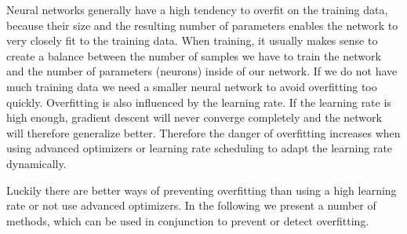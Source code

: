 Neural networks generally have a high tendency to overfit on the training data, because their size and the resulting number of parameters enables the network to very closely fit to the training data. When training, it usually makes sense to create a balance between the number of samples we have to train the network and the number of parameters (neurons) inside of our network. If we do not have much training data we need a smaller neural network to avoid overfitting too quickly. Overfitting is also influenced by the learning rate. If the learning rate is high enough, gradient descent will never converge completely and the network will therefore generalize better. Therefore the danger of overfitting increases when using advanced optimizers or learning rate scheduling to adapt the learning rate dynamically.

Luckily there are better ways of preventing overfitting than using a high learning rate or not use advanced optimizers. In the following we present a number of methods, which can be used in conjunction to prevent or detect overfitting.

